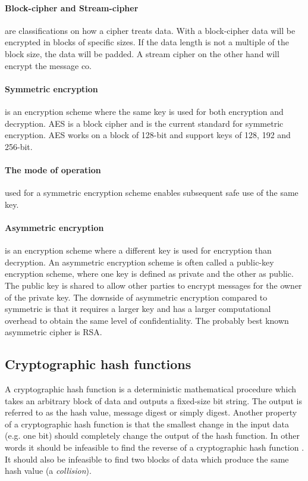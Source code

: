 \documentclass[pdftex,english,10pt,b5paper,twoside]{book}
\begin{document}
\paragraph{Block-cipher and Stream-cipher} are classifications on how a cipher
treats data\cite[p. 32]{stallings}. With a block-cipher data will be encrypted
in blocks of specific sizes. If the data length is not a multiple of the block
size, the data will be padded. A stream cipher on the other hand will encrypt
the message co.

\paragraph{Symmetric encryption} is an encryption scheme where the same key is
used for both encryption and decryption\cite[p. 32]{stallings}. \ac{AES} is a
block cipher and is the current standard for symmetric encryption. \ac{AES}
works on a block of 128-bit and support keys of 128, 192 and 256-bit. 

\paragraph{The mode of operation} used for a symmetric encryption scheme
enables subsequent safe use of the same key.

\paragraph{Asymmetric encryption} is an encryption scheme where a different key
is used for encryption than decryption\cite[p. 259]{stallings}. An asymmetric
encryption scheme is often called a public-key encryption scheme, where one key
is defined as private and the other as public. The public key is shared to
allow other parties to encrypt messages for the owner of the private key. The
downside of asymmetric encryption compared to symmetric is that it requires a
larger key and has a larger computational overhead to obtain the same level of
confidentiality. The probably best known asymmetric cipher is \ac{RSA}.

\subsection{Cryptographic hash functions}
A cryptographic hash function is a deterministic mathematical procedure which
takes an arbitrary block of data and outputs a fixed-size bit string. The output
is referred to as the hash value, message digest or simply digest.
Another property of a cryptographic hash function is that the smallest change in
the input data (e.g. one bit) should completely change the output of the hash
function. In other words it should be infeasible to find the reverse of a
cryptographic hash function \cite[p. 335]{stallings}. It should also be infeasible to
find two blocks of data which produce the same hash value (a \emph{collision}).
\end{document}
